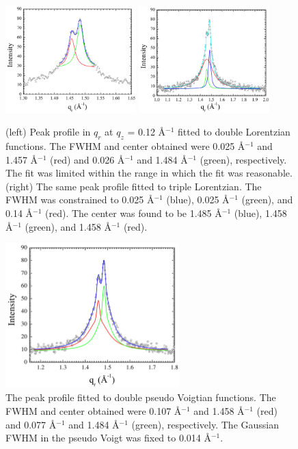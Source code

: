 \begin{figure}[htbp]
  \centering
  \includegraphics[width=0.45\textwidth]{figures/ripple/nGIWAXS/weak_peak_Lorentz}
  \includegraphics[width=0.45\textwidth]{figures/ripple/nGIWAXS/weak_peak_tripleLorentz}
  \caption[Peak profile in $q_r$ at $q_z$ = 0.12 \AA$^{-1}$ fitted to
  double Lorentzian (left) and double pseudo Voigtian functions (right)]
  {(left) Peak profile in $q_r$ at $q_z$ = 0.12 \AA$^{-1}$ fitted to
  double Lorentzian functions. 
  The FWHM and center obtained were 0.025 \AA$^{-1}$ and 1.457 \AA$^{-1}$ (red) 
  and 0.026 \AA$^{-1}$ and 1.484 \AA$^{-1}$ (green), respectively.
  The fit was limited within the range in which the fit was reasonable.
  (right) The same peak profile fitted to triple Lorentzian. The FWHM was
  constrained to 0.025 \AA$^{-1}$ (blue), 0.025 \AA$^{-1}$ (green), and 0.14 \AA$^{-1}$ (red).
  The center was found to be 1.485 \AA$^{-1}$ (blue), 1.458 \AA$^{-1}$ (green), 
  and 1.458 \AA$^{-1}$ (red).}
  \label{fig:weak_peak}
\end{figure}

\begin{figure}[htbp]
  \centering
  \includegraphics[width=0.6\textwidth]{figures/ripple/nGIWAXS/weak_peak_pseudoVoigt}
  \caption[]
  {The peak profile fitted to double pseudo Voigtian functions.
  The FWHM and center obtained were 0.107 \AA$^{-1}$ and 1.458 \AA$^{-1}$ (red) 
  and 0.077 \AA$^{-1}$ and 1.484 \AA$^{-1}$ (green), respectively.
  The Gaussian FWHM in the pseudo Voigt was fixed to 0.014 \AA$^{-1}$.}
  \label{fig:pseudoVoigt}
\end{figure}

